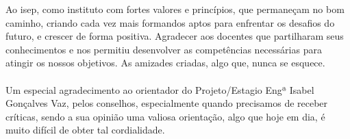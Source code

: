 
\begin{acknowledgements}

Ao \ac{isep}, como instituto com fortes valores e princípios, que permaneçam no bom caminho, criando cada vez mais formandos aptos para enfrentar os desafios do futuro, e crescer de forma positiva. Agradecer aos docentes que partilharam seus conhecimentos e nos permitiu desenvolver as competências necessárias para atingir os nossos objetivos. As amizades criadas, algo que, nunca se esquece.\\
\\
Um especial agradecimento ao orientador do Projeto/Estagio Engª Isabel Gonçalves Vaz, pelos conselhos, especialmente quando precisamos de receber críticas, sendo a sua opinião uma valiosa orientação, algo que hoje em dia, é muito difícil de obter tal cordialidade.

\end{acknowledgements}
